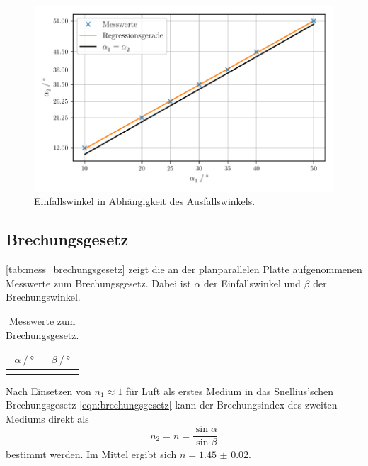\begin{figure}
    \centering
    \includegraphics[width=\textwidth]{build/plt/reflexionsgesetz.pdf}
    \caption{Einfallswinkel in Abhängigkeit des Ausfallswinkels.}
    \label{fig:plt_reflexionsgesetz}
\end{figure}


\FloatBarrier %
\subsection{Brechungsgesetz}
\label{sec:auswertung:brechungsgesetz}
\autoref{tab:mess_brechungsgesetz} zeigt die
an der
\hyperref[sec:durchfuehrung:brechung:planparallele_platte]{planparallelen Platte}
aufgenommenen Messwerte zum Brechungsgesetz.
Dabei ist $\alpha$ der Einfallswinkel und $\beta$ der Brechungswinkel.

\begin{table}
  \centering
  \caption{Messwerte zum Brechungsgesetz.}
  \label{tab:mess_brechungsgesetz}
  \begin{tabular}{S S}
    \toprule
    {$\alpha \mathbin{/} \si{\degree}$} &
    {$\beta \mathbin{/} \si{\degree}$} \\
    \midrule
    \bottomrule
  \end{tabular}
\end{table}

Nach Einsetzen von $n_1 \approx 1$ für Luft als erstes Medium
in das Snellius'schen Brechungsgesetz \eqref{eqn:brechungsgesetz}
kann der Brechungsindex des zweiten Mediums direkt als
\[ n_2 = n = \frac{\sin\alpha}{\sin\beta} \]
bestimmt werden.
Im Mittel ergibt sich $n = \num{1.45(2)}$.

